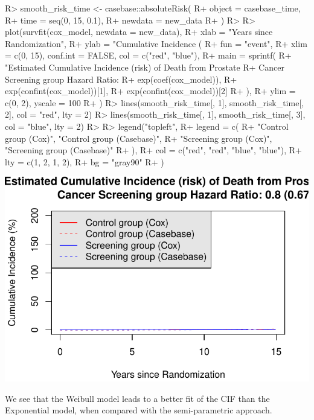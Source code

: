 \documentclass[
]{jss}
\begin{document}
\begin{CodeChunk}

\begin{CodeInput}
R> smooth_risk_time <- casebase::absoluteRisk(
R+   object = casebase_time,
R+   time = seq(0, 15, 0.1),
R+   newdata = new_data
R+ )
R> 
R> plot(survfit(cox_model, newdata = new_data),
R+   xlab = "Years since Randomization",
R+   ylab = "Cumulative Incidence (%
R+   fun = "event",
R+   xlim = c(0, 15), conf.int = FALSE, col = c("red", "blue"),
R+   main = sprintf(
R+     "Estimated Cumulative Incidence (risk) of Death from Prostate 
R+                     Cancer Screening group Hazard Ratio: %
R+     exp(coef(cox_model)),
R+     exp(confint(cox_model))[1],
R+     exp(confint(cox_model))[2]
R+   ),
R+   ylim = c(0, 2), yscale = 100
R+ )
R> lines(smooth_risk_time[, 1], smooth_risk_time[, 2], col = "red", lty = 2)
R> lines(smooth_risk_time[, 1], smooth_risk_time[, 3], col = "blue", lty = 2)
R> 
R> legend("topleft",
R+   legend = c(
R+     "Control group (Cox)", "Control group (Casebase)",
R+     "Screening group (Cox)", "Screening group (Casebase)"
R+   ),
R+   col = c("red", "red", "blue", "blue"),
R+   lty = c(1, 2, 1, 2),
R+   bg = "gray90"
R+ )
\end{CodeInput}


\begin{center}\includegraphics{../figures/erspc-casebase-weibull-cif-1} \end{center}

\end{CodeChunk}

We see that the Weibull model leads to a better fit of the CIF than the
Exponential model, when compared with the semi-parametric approach.
\end{document}
